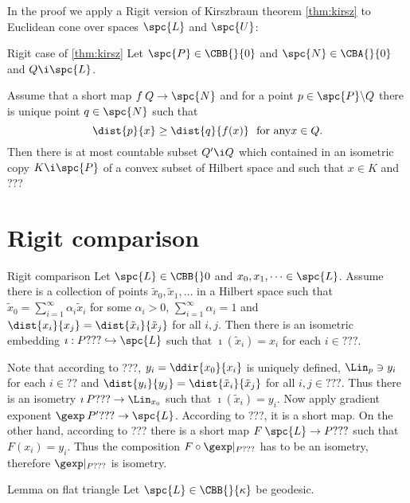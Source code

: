 {In the proof we apply a Rigit version of Kirszbraun theorem \ref{thm:kirsz} to Euclidean cone over spaces $\spc{L}$ and $\spc{U}$:

\begin{thm}{Rigit case of \ref{thm:kirsz}} 
Let $\spc{P}\in\CBB{}{0}$ and $\spc{N}\in\CBA{}{0}$ and $Q\i \spc{L}$.

Assume that a short map $f\:Q\to \spc{N}$ and for a point $p\in \spc{P}\backslash Q$ there is unique point $q\in \spc{N}$ such that
$$\dist{p}{x}\ge\dist{q}{f(x)}\ \ \text{for any} x\in Q.$$
Then there is at most countable subset $Q'\i Q$ which contained in an isometric copy $K\i \spc{P}$ of a convex subset of Hilbert space and such that $x\in K$ and ???
\end{thm}















\section{Rigit comparison}

\begin{thm}{Rigit comparison}
Let $\spc{L}\in\CBB{}0$ and $x_0,x_1,\dots\in \spc{L}$.
Assume there is a collection of points $\tilde x_0,\tilde x_1,\dots$ in a Hilbert space such that $\tilde x_0=\sum_{i=1}^\infty\alpha_i\tilde x_i$ for some $\alpha_i>0$, $\sum_{i=1}^\infty\alpha_i=1$ and $\dist{x_i}{x_j}=\dist{\tilde x_i}{\tilde x_j}$ for all $i,j$.
Then there is an isometric embedding $\imath:P???\hookrightarrow \spc{L}$ such that $\imath(\tilde x_i)=x_i$ for each $i\in???$.
\end{thm}

 Note that according to ???, $y_i=\ddir{x_0}{x_i}$ is uniquely defined, $\Lin_p\ni y_i$ for each $i\in??$ and $\dist{y_i}{y_j}=\dist{\tilde x_i}{\tilde x_j}$ for all $i,j\in???$.
Thus there is an isometry  $\imath\:P???\to\Lin_{x_0}$ such that $\imath(\tilde x_i)=y_i$.
Now apply gradient exponent $\gexp\:P'???\to \spc{L}$.
According to ???, it is a short map.
On the other hand, according to ??? there is a short map $F\:\spc{L}\to P???$ such that $F(x_i)=y_i$.
Thus the composition $F\circ\gexp|_{P???}$ has to be an isometry, therefore $\gexp|_{P???}$ is isometry.
\qeds

\begin{thm}{Lemma on flat triangle}\label{lem:flat-trig}
Let $\spc{L}\in\CBB{}{\kappa}$ be geodesic.


\end{thm}}
